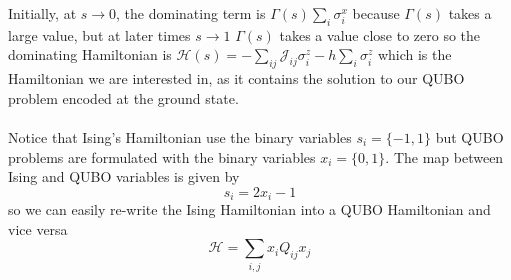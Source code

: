Initially, at $s \rightarrow 0$, the dominating term is $\Gamma(s)\sum_{i}\sigma_{i}^{x}$ because $\Gamma(s)$ takes a large value, but at later times $s \rightarrow 1$ $\Gamma(s)$ takes a value close to zero so the dominating Hamiltonian is $\mathcal{H}(s) = -\sum_{ij}\mathcal{J}_{ij}\sigma_{i}^{z} - h\sum_{i}\sigma_{i}^{z}$ which is the Hamiltonian we are interested in, as it contains the solution to our QUBO problem encoded at the ground state.\\\\
Notice that Ising's Hamiltonian use the binary variables $s_{i} = \{-1,1\}$ but QUBO problems are formulated with the binary variables $x_{i} = \{0,1\}$. The map between Ising and QUBO variables is given by
\begin{equation}
    s_{i} = 2x_{i} -1
\end{equation}
so we can easily re-write the Ising Hamiltonian into a QUBO Hamiltonian and vice versa
\begin{equation}
    \mathcal{H} = \sum_{i,j}x_{i}Q_{ij}x_{j}
\end{equation}
